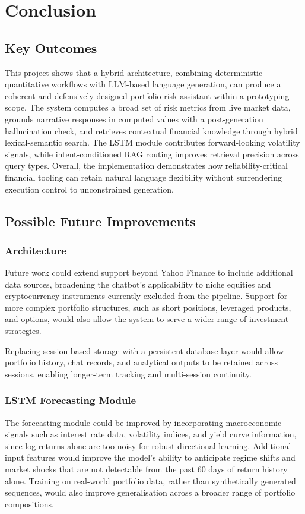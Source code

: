 \section{Conclusion}
\label{sec:conclusion}

\subsection{Key Outcomes}
This project shows that a hybrid architecture, combining deterministic quantitative workflows with LLM-based language generation, can produce a coherent and defensively designed portfolio risk assistant within a prototyping scope. The system computes a broad set of risk metrics from live market data, grounds narrative responses in computed values with a post-generation hallucination check, and retrieves contextual financial knowledge through hybrid lexical-semantic search. The LSTM module contributes forward-looking volatility signals, while intent-conditioned RAG routing improves retrieval precision across query types. Overall, the implementation demonstrates how reliability-critical financial tooling can retain natural language flexibility without surrendering execution control to unconstrained generation.

\subsection{Possible Future Improvements}

\subsubsection{Architecture}
Future work could extend support beyond Yahoo Finance to include additional data sources, broadening the chatbot's applicability to niche equities and cryptocurrency instruments currently excluded from the pipeline. Support for more complex portfolio structures, such as short positions, leveraged products, and options, would also allow the system to serve a wider range of investment strategies.

Replacing session-based storage with a persistent database layer would allow portfolio history, chat records, and analytical outputs to be retained across sessions, enabling longer-term tracking and multi-session continuity.

\subsubsection{LSTM Forecasting Module}
The forecasting module could be improved by incorporating macroeconomic signals such as interest rate data, volatility indices, and yield curve information, since log returns alone are too noisy for robust directional learning. Additional input features would improve the model's ability to anticipate regime shifts and market shocks that are not detectable from the past 60 days of return history alone. Training on real-world portfolio data, rather than synthetically generated sequences, would also improve generalisation across a broader range of portfolio compositions.

